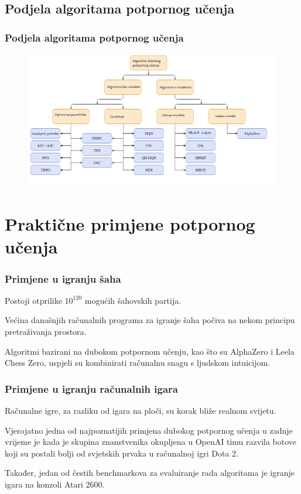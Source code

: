 \documentclass{beamer}
\begin{document}
\subsection{Podjela algoritama potpornog učenja}

\begin{frame}
	\frametitle{Podjela algoritama potpornog učenja}

	\begin{figure}[h!]
		\centering
		\includegraphics[width=\columnwidth]{img/podjela.png}
		\label{fig:podjela}
	\end{figure}

\end{frame}

\section{Praktične primjene potpornog učenja}

\begin{frame}
	\frametitle{Primjene u igranju šaha}

	Postoji otprilike ${10^{120}}$ mogućih šahovskih partija.
	\bigskip

	Većina današnjih računalnih programa za igranje šaha počiva na nekom principu pretraživanja prostora.
	\bigskip

	Algoritmi bazirani na dubokom potpornom učenju, kao što su AlphaZero i Leela Chess Zero, uspjeli su kombinirati računalnu snagu s ljudskom intuicijom.

\end{frame}

\begin{frame}
	\frametitle{Primjene u igranju računalnih igara}

	Računalne igre, za razliku od igara na ploči, su korak bliže realnom svijetu.
	\bigskip

	Vjerojatno jedna od najpoznatijih primjena dubokog potpornog učenja u zadnje vrijeme je kada je skupina znanstvenika okupljena u OpenAI timu razvila botove koji su postali bolji od svjetskih prvaka u računalnoj igri Dota 2.
	\bigskip

	Također, jedan od čestih benchmarkova za evaluiranje rada algoritama je igranje igara na konzoli Atari 2600.

\end{frame}
\end{document}
